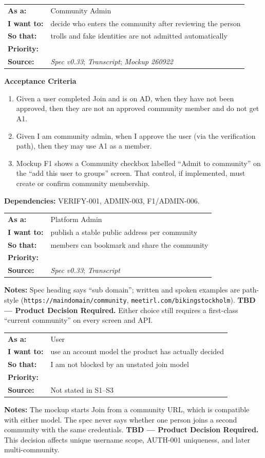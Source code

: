 \documentclass[11pt,a4paper]{article}
\makeatletter
\newcommand{\priPzero}{\colorbox{p0}{\makebox[4.6em]{\textcolor{white}{\scriptsize\bfseries P0 V1}}}}
\newcommand{\priTBD}{\colorbox{tbd}{\makebox[4.6em]{\textcolor{white}{\scriptsize\bfseries TBD}}}}
\newcommand{\srcSpec}{\textit{Spec v0.33}}
\newcommand{\srcTx}{\textit{Transcript}}
\newcommand{\srcMock}{\textit{Mockup 260922}}
\newenvironment{story}[1]{%
  \Needspace{10\baselineskip}%
  \vspace{0.7em}%
  \noindent
  \colorbox{navy}{\makebox[\dimexpr\textwidth-2\fboxsep\relax][l]{\textcolor{white}{\bfseries\ #1}}}%
  \par\vspace{0.35em}%
}{\par\vspace{0.55em}}
\newcommand{\storymeta}[5]{%
  \noindent
  \begin{tabularx}{\textwidth}{@{}>{\bfseries}l X@{}}
    As a: & #1 \\
    I want to: & #2 \\
    So that: & #3 \\
    Priority: & #4 \\
    Source: & #5 \\
  \end{tabularx}
  \par\vspace{0.3em}
}
\newcommand{\achead}{\noindent\textbf{Acceptance Criteria}\par}
\newcommand{\deps}[1]{\noindent\textbf{Dependencies:} #1\par}
\newcommand{\notes}[1]{\noindent\textbf{Notes:} #1\par}
\makeatother
\begin{document}
\begin{story}{COMM-004 --- Membership only after manual admin approval}
\storymeta{Community Admin}{decide who enters the community after reviewing the person}{trolls and fake identities are not admitted automatically}{\priPzero}{\srcSpec; \srcTx; \srcMock}
\achead
\begin{enumerate}
  \item Given a user completed Join and is on AD, when they have not been approved, then they are not an approved community member and do not get A1.
  \item Given I am community admin, when I approve the user (via the verification path), then they may use A1 as a member.
  \item Mockup F1 shows a Community checkbox labelled ``Admit to community'' on the ``add this user to groups'' screen. That control, if implemented, must create or confirm community membership.
\end{enumerate}
\deps{VERIFY-001, ADMIN-003, F1/ADMIN-006.}
\end{story}

\begin{story}{COMM-005 --- Path versus subdomain (conflict)}
\storymeta{Platform Admin}{publish a stable public address per community}{members can bookmark and share the community}{\priTBD}{\srcSpec; \srcTx}
\notes{Spec heading says ``sub domain''; written and spoken examples are path-style (\texttt{https://maindomain/community}, \texttt{meetirl.com/bikingstockholm}). \textbf{TBD --- Product Decision Required.} Either choice still requires a first-class ``current community'' on every screen and API.}
\end{story}

\begin{story}{COMM-006 --- Account scope: per community vs platform-wide}
\storymeta{User}{use an account model the product has actually decided}{I am not blocked by an unstated join model}{\priTBD}{Not stated in S1--S3}
\notes{The mockup starts Join from a community URL, which is compatible with either model. The spec never says whether one person joins a second community with the same credentials. \textbf{TBD --- Product Decision Required.} This decision affects unique username scope, AUTH-001 uniqueness, and later multi-community.}
\end{story}
\end{document}
